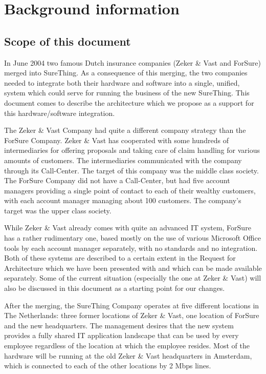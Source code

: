 \chapter{Background information}

\section{Scope of this document}
In June 2004 two famous Dutch insurance companies (Zeker \& Vast
and ForSure) merged into SureThing. As a consequence of this merging,
the two companies needed to integrate both their hardware and
software into a single, unified, system which could serve for running the
business of the new SureThing. This document comes to describe the
architecture which we propose as a support for this hardware/software
integration.

The Zeker \& Vast Company had quite a different company strategy
than the ForSure Company. Zeker \& Vast has cooperated with some
hundreds of intermediaries for offering proposals and taking care
of claim handling for various amounts of customers. The intermediaries
communicated with the company through its Call-Center. The target
of this company was the middle class society. The ForSure Company did
not have a Call-Center, but had five account managers providing a single
point of contact to each of their wealthy customers, with each account
manager managing about 100 customers. The company's target was the
upper class society.

While Zeker \& Vast already comes with quite an advanced IT system,
ForSure has a rather rudimentary one, based mostly on the use of various
Microsoft Office tools by each account manager separately, with no standards
and no integration. Both of these systems are described to a certain
extent in the Request for Architecture which we have been presented
with and which can be made available separately. Some of the current
situation (especially the one at Zeker \& Vast) will also be discussed
in this document as a starting point for our changes.

After the merging, the SureThing Company operates at five different
locations in The Netherlands: three former locations of Zeker \&
Vast, one location of ForSure and the new headquarters. The
management desires that the new system provides a fully shared IT
application landscape that can be used by every employee
regardless of the location at which the employee resides. Most of
the hardware will be running at the old Zeker \& Vast headquarters in
Amsterdam, which is connected to each of the other locations by  2 Mbps
lines.

